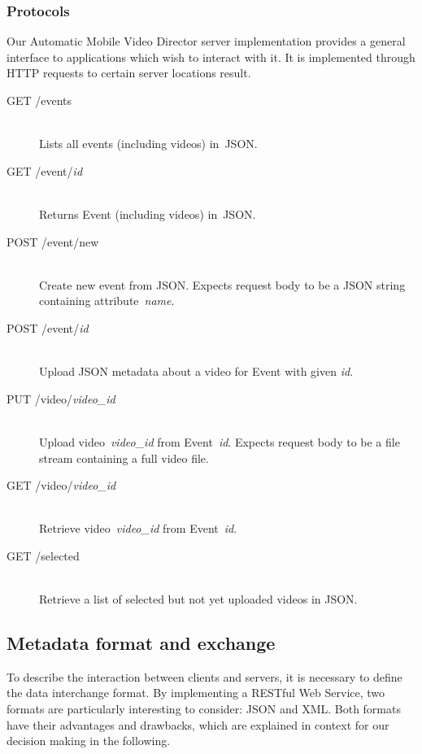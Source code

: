 \documentclass[conference]{IEEEtran}
\begin{document}
\subsubsection{Protocols}
Our Automatic Mobile Video Director server implementation provides 
a general interface to applications which wish to interact with it. 
It is implemented through HTTP requests to certain server locations result.

\begin{description}
	\item[GET /events]\hfill\\
		Lists all events (including videos) in~JSON.
		
	\item[GET /event/\textit{id}]\hfill\\
		Returns Event (including videos) in~JSON.
				
	\item[POST /event/new]\hfill\\
		Create new event from JSON.
		Expects request body to be a JSON string containing attribute~\textit{name}.
		
	\item[POST /event/\textit{id}]\hfill\\
		Upload JSON metadata about a video for Event with given \textit{id}.
		
	\item[PUT /video/\textit{video\_id}]\hfill\\
		Upload video~\textit{video\_id} from Event~\textit{id}.
		Expects request body to be a file stream containing a full video file.
		
	\item[GET /video/\textit{video\_id}]\hfill\\
		Retrieve video~\textit{video\_id} from Event~\textit{id}.
		
	\item[GET /selected]\hfill\\
		Retrieve a list of selected but not yet uploaded videos in JSON.		
		
\end{description}

\subsection{Metadata format and exchange}

To describe the interaction between clients and servers, it is necessary to define the data interchange format.
By implementing a RESTful Web Service, two formats are particularly interesting to consider: JSON and XML.
Both formats have their advantages and drawbacks, which are explained in context for our decision making in the following.
\end{document}
